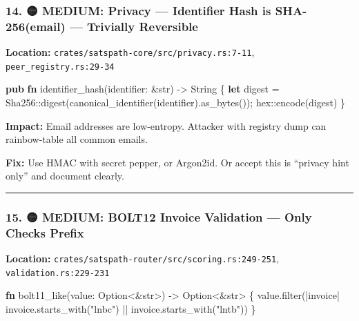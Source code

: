\documentclass[
]{article}
\newenvironment{Shaded}{}{}
\newcommand{\DataTypeTok}[1]{\textcolor[rgb]{0.56,0.13,0.00}{#1}}
\newcommand{\KeywordTok}[1]{\textcolor[rgb]{0.00,0.44,0.13}{\textbf{#1}}}
\newcommand{\NormalTok}[1]{#1}
\newcommand{\OperatorTok}[1]{\textcolor[rgb]{0.40,0.40,0.40}{#1}}
\newcommand{\PreprocessorTok}[1]{\textcolor[rgb]{0.74,0.48,0.00}{#1}}
\newcommand{\StringTok}[1]{\textcolor[rgb]{0.25,0.44,0.63}{#1}}
\begin{document}
\hypertarget{medium-privacy-identifier-hash-is-sha-256email-trivially-reversible}{%
\subsubsection{14. 🟡 MEDIUM: Privacy --- Identifier Hash is
SHA-256(email) --- Trivially
Reversible}\label{medium-privacy-identifier-hash-is-sha-256email-trivially-reversible}}

\textbf{Location:} \texttt{crates/satspath-core/src/privacy.rs:7-11},
\texttt{peer\_registry.rs:29-34}

\begin{Shaded}
\begin{Highlighting}[]
\KeywordTok{pub} \KeywordTok{fn}\NormalTok{ identifier\_hash(identifier}\OperatorTok{:} \OperatorTok{\&}\DataTypeTok{str}\NormalTok{) }\OperatorTok{{-}\textgreater{}} \DataTypeTok{String} \OperatorTok{\{}
    \KeywordTok{let}\NormalTok{ digest }\OperatorTok{=} \PreprocessorTok{Sha256::}\NormalTok{digest(canonical\_identifier(identifier)}\OperatorTok{.}\NormalTok{as\_bytes())}\OperatorTok{;}
    \PreprocessorTok{hex::}\NormalTok{encode(digest)}
\OperatorTok{\}}
\end{Highlighting}
\end{Shaded}

\textbf{Impact:} Email addresses are low-entropy. Attacker with registry
dump can rainbow-table all common emails.

\textbf{Fix:} Use HMAC with secret pepper, or Argon2id. Or accept this
is ``privacy hint only'' and document clearly.

\begin{center}\rule{0.5\linewidth}{0.5pt}\end{center}

\hypertarget{medium-bolt12-invoice-validation-only-checks-prefix}{%
\subsubsection{15. 🟡 MEDIUM: BOLT12 Invoice Validation --- Only Checks
Prefix}\label{medium-bolt12-invoice-validation-only-checks-prefix}}

\textbf{Location:}
\texttt{crates/satspath-router/src/scoring.rs:249-251},
\texttt{validation.rs:229-231}

\begin{Shaded}
\begin{Highlighting}[]
\KeywordTok{fn}\NormalTok{ bolt11\_like(value}\OperatorTok{:} \DataTypeTok{Option}\OperatorTok{\textless{}\&}\DataTypeTok{str}\OperatorTok{\textgreater{}}\NormalTok{) }\OperatorTok{{-}\textgreater{}} \DataTypeTok{Option}\OperatorTok{\textless{}\&}\DataTypeTok{str}\OperatorTok{\textgreater{}} \OperatorTok{\{}
\NormalTok{    value}\OperatorTok{.}\NormalTok{filter(}\OperatorTok{|}\NormalTok{invoice}\OperatorTok{|}\NormalTok{ invoice}\OperatorTok{.}\NormalTok{starts\_with(}\StringTok{"lnbc"}\NormalTok{) }\OperatorTok{||}\NormalTok{ invoice}\OperatorTok{.}\NormalTok{starts\_with(}\StringTok{"lntb"}\NormalTok{))}
\OperatorTok{\}}
\end{Highlighting}
\end{Shaded}
\end{document}
